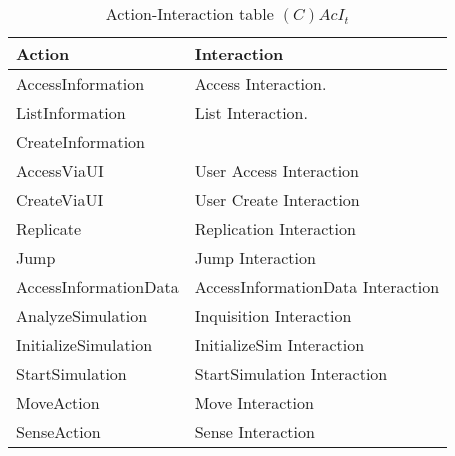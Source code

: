 \begin{table}[H]
	\centering
	\begin{tabular}{|p{4cm}|p{8cm}|}
			\hline
			\textbf{Action} & \textbf{Interaction} \\
			\hline
			AccessInformation & Access Interaction. \\
			\hline
			ListInformation & List Interaction. \\
			\hline
			CreateInformation & \\
			\hline
			AccessViaUI & User Access Interaction \\
			\hline
			CreateViaUI & User Create Interaction \\
			\hline
			Replicate & Replication Interaction \\
			\hline
			Jump & Jump Interaction \\
			\hline
			AccessInformationData & AccessInformationData Interaction \\
			\hline
			AnalyzeSimulation & Inquisition Interaction \\
			\hline
			InitializeSimulation & InitializeSim Interaction \\
			\hline
			StartSimulation & StartSimulation Interaction \\
			\hline
			MoveAction & Move Interaction \\
			\hline
			SenseAction & Sense Interaction \\
			\hline
		\end{tabular}
	\caption{Action-Interaction table $(C)AcI_t$}
	\label{tab:cacit}
\end{table}

